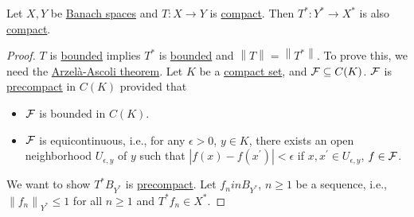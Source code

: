 \begin{theorem}
	Let \(X, Y\) be \hyperref[def:Banach-space]{Banach spaces} and \(T\colon X\to Y\) is \hyperref[def:compact-op]{compact}. Then \(T^{\ast} \colon Y^{\ast} \to X^{\ast} \) is also \hyperref[def:compact-op]{compact}.
\end{theorem}
\begin{proof}
	\(T\) is \hyperref[def:bounded-op]{bounded} implies \(T^{\ast} \) is \hyperref[def:bounded-op]{bounded} and \(\left\lVert T\right\rVert = \left\lVert T^{\ast} \right\rVert \). To prove this, we need the \href{https://en.wikipedia.org/wiki/Arzel%C3%A0%E2%80%93Ascoli_theorem}{Arzelà-Ascoli theorem}. Let \(K\) be a \hyperref[def:compact]{compact set}, and \(\mathcal{\MakeUppercase{f}} \subseteq C(K)\). \(\mathcal{\MakeUppercase{f}} \) is \hyperref[def:precompct]{precompact} in \(C(K)\) provided that 
	\begin{itemize}
		\item \(\mathcal{\MakeUppercase{f}} \) is bounded in \(C(K)\).
		\item \(\mathcal{\MakeUppercase{f}} \) is equicontinuous, i.e., for any \(\epsilon >0\), \(y\in K\), there exists an open neighborhood \(U_{\epsilon , y}\) of \(y\) such that \(\left\vert f(x) - f(x^\prime ) \right\vert< \epsilon \) if \(x, x^\prime \in U_{\epsilon , y}\), \(f\in \mathcal{\MakeUppercase{f}} \).
	\end{itemize}
	We want to show \(T^{\ast} B_{Y^{\ast} }\) is \hyperref[def:precompact]{precompact}. Let \(f_{n} in B_{Y^{\ast} }\), \(n \geq 1\) be a sequence, i.e., \(\left\lVert f_n \right\rVert _{Y^{\ast} } \leq 1\) for all \(n\geq 1\) and \(T^{\ast} f_{n} \in X^{\ast} \).
\end{proof}